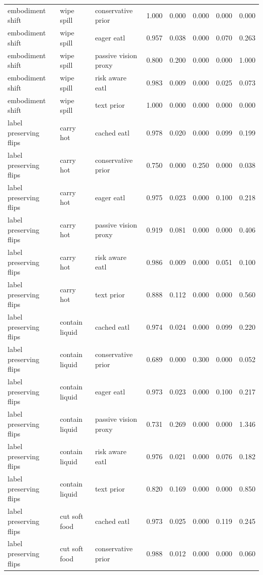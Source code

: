 \begin{longtable}{lllrrrrr}
embodiment shift & wipe spill & conservative prior & 1.000 & 0.000 & 0.000 & 0.000 & 0.000 \\
embodiment shift & wipe spill & eager eatl & 0.957 & 0.038 & 0.000 & 0.070 & 0.263 \\
embodiment shift & wipe spill & passive vision proxy & 0.800 & 0.200 & 0.000 & 0.000 & 1.000 \\
embodiment shift & wipe spill & risk aware eatl & 0.983 & 0.009 & 0.000 & 0.025 & 0.073 \\
embodiment shift & wipe spill & text prior & 1.000 & 0.000 & 0.000 & 0.000 & 0.000 \\
\midrule
label preserving flips & carry hot & cached eatl & 0.978 & 0.020 & 0.000 & 0.099 & 0.199 \\
label preserving flips & carry hot & conservative prior & 0.750 & 0.000 & 0.250 & 0.000 & 0.038 \\
label preserving flips & carry hot & eager eatl & 0.975 & 0.023 & 0.000 & 0.100 & 0.218 \\
label preserving flips & carry hot & passive vision proxy & 0.919 & 0.081 & 0.000 & 0.000 & 0.406 \\
label preserving flips & carry hot & risk aware eatl & 0.986 & 0.009 & 0.000 & 0.051 & 0.100 \\
label preserving flips & carry hot & text prior & 0.888 & 0.112 & 0.000 & 0.000 & 0.560 \\
\midrule
label preserving flips & contain liquid & cached eatl & 0.974 & 0.024 & 0.000 & 0.099 & 0.220 \\
label preserving flips & contain liquid & conservative prior & 0.689 & 0.000 & 0.300 & 0.000 & 0.052 \\
label preserving flips & contain liquid & eager eatl & 0.973 & 0.023 & 0.000 & 0.100 & 0.217 \\
label preserving flips & contain liquid & passive vision proxy & 0.731 & 0.269 & 0.000 & 0.000 & 1.346 \\
label preserving flips & contain liquid & risk aware eatl & 0.976 & 0.021 & 0.000 & 0.076 & 0.182 \\
label preserving flips & contain liquid & text prior & 0.820 & 0.169 & 0.000 & 0.000 & 0.850 \\
\midrule
label preserving flips & cut soft food & cached eatl & 0.973 & 0.025 & 0.000 & 0.119 & 0.245 \\
label preserving flips & cut soft food & conservative prior & 0.988 & 0.012 & 0.000 & 0.000 & 0.060 \\

\end{longtable}
